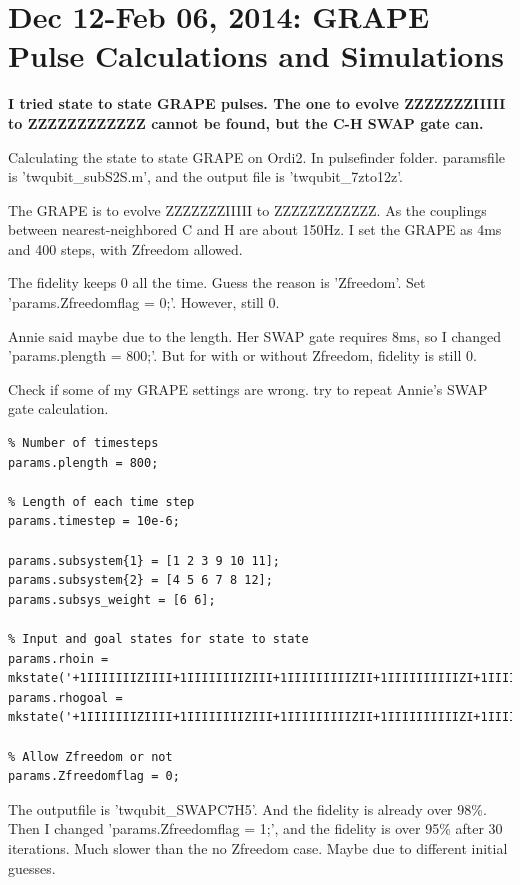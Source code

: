 \section{Dec 12-Feb 06, 2014: GRAPE Pulse Calculations and Simulations}

{}

\textbf{I tried state to state GRAPE pulses. The one to evolve ZZZZZZZIIIII to ZZZZZZZZZZZZ cannot be found, but the C-H SWAP gate can.}

Calculating the state to state GRAPE on Ordi2. In pulsefinder folder. paramsfile is 'twqubit\_subS2S.m', and the output file is 'twqubit\_7zto12z'.

The GRAPE is to evolve ZZZZZZZIIIII to ZZZZZZZZZZZZ. As the couplings between nearest-neighbored C and H are about 150Hz. I set the GRAPE as 4ms and 400 steps, with Zfreedom allowed.

The fidelity keeps 0 all the time. Guess the reason is 'Zfreedom'. Set 'params.Zfreedomflag = 0;'. However, still 0.

Annie said maybe due to the length. Her SWAP gate requires 8ms, so I changed 'params.plength = 800;'. But for with or without Zfreedom, fidelity is still 0.

Check if some of my GRAPE settings are wrong. try to repeat Annie's SWAP gate calculation.

\begin{lstlisting}
% Number of timesteps
params.plength = 800;

% Length of each time step
params.timestep = 10e-6;

params.subsystem{1} = [1 2 3 9 10 11];
params.subsystem{2} = [4 5 6 7 8 12];
params.subsys_weight = [6 6];

% Input and goal states for state to state
params.rhoin = mkstate('+1IIIIIIIZIIII+1IIIIIIIIZIII+1IIIIIIIIIZII+1IIIIIIIIIIZI+1IIIIIIIIIIIZ',1);
params.rhogoal = mkstate('+1IIIIIIIZIIII+1IIIIIIIIZIII+1IIIIIIIIIZII+1IIIIIIIIIIZI+1IIIIIIZIIIIZ',1);

% Allow Zfreedom or not
params.Zfreedomflag = 0;
\end{lstlisting}

The outputfile is 'twqubit\_SWAPC7H5'. And the fidelity is already over 98\%. Then I changed 'params.Zfreedomflag = 1;', and the fidelity is over 95\% after 30 iterations. Much slower than the no Zfreedom case. Maybe due to different initial guesses.

{}

